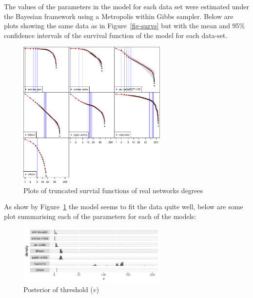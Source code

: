\documentclass[
  10pt,
  a4paper,
]{scrreprt}
\theoremstyle{plain}
\theoremstyle{plain}
\theoremstyle{definition}
\theoremstyle{plain}
\theoremstyle{remark}
\begin{document}
{The values of the parameters in the model for each data set were
estimated under the Bayesian framework using a Metropolis within Gibbs
sampler. Below are plots showing the same data as in
Figure~\ref{fig-survs} but with the mean and 95\% confidence intervals
of the survival function of the model for each data-set.

\begin{figure}[H]

{\centering \includegraphics[width=0.66\textwidth,height=\textheight]{doc_files/figure-pdf/fig-fits1-1.pdf}

}

\caption{\label{fig-fits1}Plots of truncated survial functions of real
networks degrees}

\end{figure}

As show by Figure~\ref{fig-fits1} the model seems to fit the data quite
well, below are some plot summarising each of the parameters for each of
the models:

\begin{figure}[H]

{\centering \includegraphics[width=0.66\textwidth,height=\textheight]{doc_files/figure-pdf/fig-thresh-1.pdf}

}

\caption{\label{fig-thresh}Posterior of threshold (\(v\))}


\end{figure}}
\end{document}
